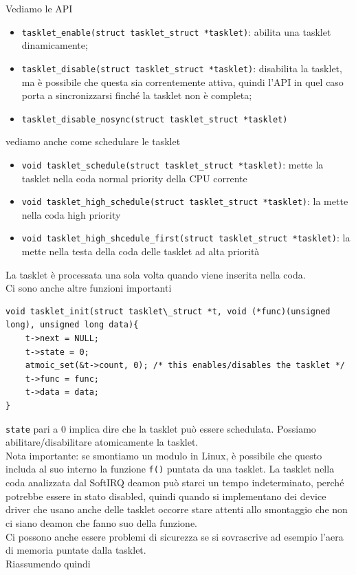 \documentclass[12pt, oneside]{extbook}
\begin{document}
Vediamo le API
\begin{itemize}
\item \texttt{tasklet\_enable(struct tasklet\_struct *tasklet)}: abilita una tasklet dinamicamente;
\item \texttt{tasklet\_disable(struct tasklet\_struct *tasklet)}: disabilita la tasklet, ma è possibile che questa sia correntemente attiva, quindi l'API in quel caso porta a sincronizzarsi finché la tasklet non è completa;
\item \texttt{tasklet\_disable\_nosync(struct tasklet\_struct *tasklet)}
\end{itemize}
vediamo anche come schedulare le tasklet
\begin{itemize}
\item \texttt{void tasklet\_schedule(struct tasklet\_struct *tasklet)}: mette la tasklet nella coda normal priority della CPU corrente
\item \texttt{void tasklet\_high\_schedule(struct tasklet\_struct *tasklet)}: la mette nella coda high priority
\item \texttt{void tasklet\_high\_shcedule\_first(struct tasklet\_struct *tasklet)}: la mette nella testa della coda delle tasklet ad alta priorità
\end{itemize}
La tasklet è processata una sola volta quando viene inserita nella coda.\\Ci sono anche altre funzioni importanti
\begin{lstlisting}
void tasklet_init(struct tasklet\_struct *t, void (*func)(unsigned long), unsigned long data){
	t->next = NULL;
	t->state = 0;
	atmoic_set(&t->count, 0); /* this enables/disables the tasklet */
	t->func = func;
	t->data = data;
}
\end{lstlisting}
\texttt{state} pari a 0 implica dire che la tasklet può essere schedulata. Possiamo abilitare/disabilitare atomicamente la tasklet.\\Nota importante: se smontiamo un modulo in Linux, è possibile che questo includa al suo interno la funzione \texttt{f()} puntata da una tasklet. La tasklet nella coda analizzata dal SoftIRQ deamon può starci un tempo indeterminato, perché potrebbe essere in stato disabled, quindi quando si implementano dei device driver che usano anche delle tasklet occorre stare attenti allo smontaggio che non ci siano deamon che fanno suo della funzione.\\Ci possono anche essere problemi di sicurezza se si sovrascrive ad esempio l'aera di memoria puntate dalla tasklet.\\Riassumendo quindi
\end{document}
